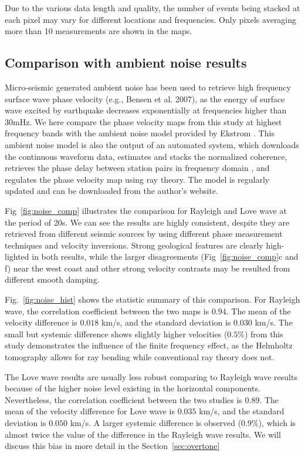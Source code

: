 \documentclass[referee]{gji}
\begin{document}
Due to the various data length and quality, the number of events being stacked at each pixel may vary for different locations and frequencies. Only pixels averaging more than 10 measurements are shown in the maps.

\subsection{Comparison with ambient noise results}
\label{sec:noise_comp}

Micro-seismic generated ambient noise has been used to retrieve high frequency surface wave phase velocity (e.g., Bensen et al. 2007), as the energy of surface wave excited by earthquake decreases exponentially at frequencies higher than 30mHz.  We here compare the phase velocity maps from this study at highest frequency bands with the ambient noise model provided by Ekstrom . This ambient noise model is also the output of an automated system, which downloads the continuous waveform data, estimates and stacks the normalized coherence, retrieves the phase delay between station pairs in frequency domain \cite{Ekstrom:1997mg}, and regulates the phase velocity map using ray theory. The model is regularly updated and can be downloaded from the author’s website.

Fig~\ref{fig:noise_comp} illustrates the comparison for Rayleigh and Love wave at the period of 20s. We can see the results are highly consistent, despite they are retrieved from different seismic sources by using different phase measurement techniques and velocity inversions. Strong geological features are clearly high-lighted in both results, while the larger disagreements (Fig~\ref{fig:noise_comp}c and f) near the west coast and other strong velocity contrasts may be resulted from different smooth damping. 

Fig.~\ref{fig:noise_hist} shows the statistic summary of this comparison. For Rayleigh wave, the correlation coefficient between the two maps is $0.94$. The mean of the velocity difference is $0.018$ km/s, and the standard deviation is $0.030$ km/s.  The small but systemic difference shows slightly higher velocities ($0.5\%$) from this study demonstrates the influence of the finite frequency effect, as the Helmholtz tomography allows for ray bending while conventional ray theory does not. 

The Love wave results are usually less robust comparing to Rayleigh wave results because of the higher noise level existing in the horizontal components. Nevertheless, the correlation coefficient between the two studies is 0.89. The mean of the velocity difference for Love wave is $0.035$ km/s, and the standard deviation is $0.050$ km/s. A larger systemic difference is observed ($0.9\%$), which is almost twice the value of the difference in the Rayleigh wave results. We will discuss this bias in more detail in the Section~\ref{sec:overtone}
\end{document}
